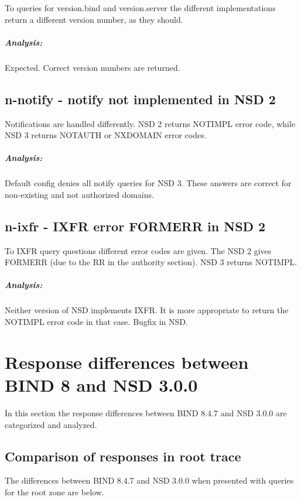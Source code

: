 \documentclass[twoside,titlepage,english]{nlnetlabs}
\begin{document}
To queries for version.bind and version.server the different implementations
return a different version number, as they should.

\vspace{-8pt}\subparagraph{Analysis:}

Expected. Correct version numbers are returned.


\subsection{n-notify - notify not implemented in NSD 2}
\label{n-notify}

Notifications are handled differently. NSD 2 returns NOTIMPL error code,
while NSD 3 returns NOTAUTH or NXDOMAIN error codes.

\vspace{-8pt}\subparagraph{Analysis:}

Default config denies all notify queries for NSD 3. These answers are correct
for non-existing and not authorized domains.


\subsection{n-ixfr - IXFR error FORMERR in NSD 2}
\label{n-ixfr}

To IXFR query questions different error codes are given. The NSD 2
gives FORMERR (due to the RR in the authority section). NSD 3 returns
NOTIMPL. 

\vspace{-8pt}\subparagraph{Analysis:}

Neither version of NSD implements IXFR. It is more appropriate to
return the NOTIMPL error code in that case. Bugfix in NSD.


\section{Response differences between BIND 8 and NSD 3.0.0}

In this section the response differences between BIND 8.4.7 and NSD 3.0.0
are categorized and analyzed. 


\subsection{Comparison of responses in root trace}

The differences between BIND 8.4.7 and NSD 3.0.0 when presented
with queries for the root zone are below.
\end{document}
